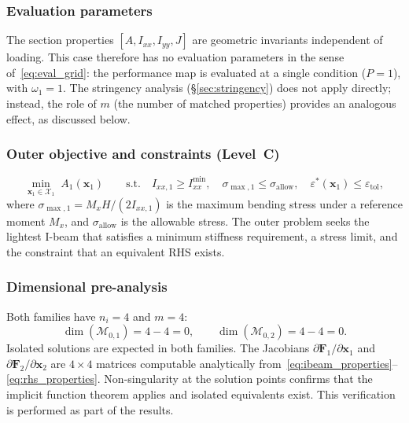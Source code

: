 \subsubsection{Evaluation parameters}

The section properties $[A, I_{xx}, I_{yy}, J]$ are geometric invariants independent of loading. This case therefore has no evaluation parameters in the sense of~\eqref{eq:eval_grid}: the performance map is evaluated at a single condition ($P = 1$), with $\omega_1 = 1$. The stringency analysis (\S\ref{sec:stringency}) does not apply directly; instead, the role of $m$ (the number of matched properties) provides an analogous effect, as discussed below.


\subsubsection{Outer objective and constraints (Level~C)}

\begin{equation}
    \min_{\mathbf{x}_1 \in \mathcal{X}_1}\; A_1(\mathbf{x}_1)
    \qquad \text{s.t.} \quad
    I_{xx,1} \geq I_{xx}^{\min}, \quad
    \sigma_{\max,1} \leq \sigma_{\mathrm{allow}},
    \quad \varepsilon^*(\mathbf{x}_1) \leq \varepsilon_{\mathrm{tol}},
    \label{eq:section_outer}
\end{equation}
where $\sigma_{\max,1} = M_x H / (2 I_{xx,1})$ is the maximum bending stress under a reference moment $M_x$, and $\sigma_{\mathrm{allow}}$ is the allowable stress. The outer problem seeks the lightest I-beam that satisfies a minimum stiffness requirement, a stress limit, and the constraint that an equivalent RHS exists.


\subsubsection{Dimensional pre-analysis}

Both families have $n_i = 4$ and $m = 4$:
\begin{equation}
    \dim(\mathcal{M}_{0,1}) = 4 - 4 = 0, \qquad
    \dim(\mathcal{M}_{0,2}) = 4 - 4 = 0.
\end{equation}
Isolated solutions are expected in both families. The Jacobians $\partial \mathbf{F}_1/\partial \mathbf{x}_1$ and $\partial \mathbf{F}_2/\partial \mathbf{x}_2$ are $4 \times 4$ matrices computable analytically from~\eqref{eq:ibeam_properties}--\eqref{eq:rhs_properties}. Non-singularity at the solution points confirms that the implicit function theorem applies and isolated equivalents exist. This verification is performed as part of the results.


